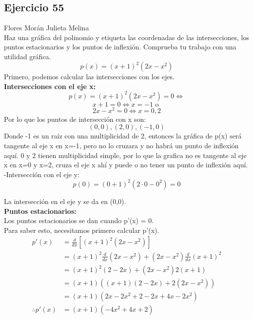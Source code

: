 \documentclass[12pt]{article}
\begin{document}
\subsection{Ejercicio 55} Flores Morán Julieta Melina \\

Haz una gráfica del polinomio y etiqueta las coordenadas de las intersecciones, los puntos estacionarios y los puntos de inflexión. Comprueba tu trabajo con una utilidad gráfica.
\[
p(x) = (x + 1)^2 (2x-x^2 )
\]
Primero, podemos calcular las intersecciones con los ejes. \\
\textbf {Intersecciones con el eje x:}
\[
p(x) = (x + 1)^2 (2x-x^2 ) = 0 \iff 
\]
\[
x+1 = 0 \iff  x = -1 \text{ o } 
 \]
 \[
 2x-x^{2}=0 \iff x = 0, 2
 \]
 Por lo que los puntos de intersección con x son:
 \[
(0,0), (2,0), (-1, 0)
 \]
 Donde -1 es un raíz con una multiplicidad de 2, entonces la gráfica de p(x) será tangente al eje x en x=-1, pero no lo cruzara y no habrá un punto de inflexión aquí. 0 y 2 tienen multiplicidad simple, por lo que la grafica no es tangente al eje x en x=0 y x=2, cruza el eje x ahí y puede o no tener un punto de inflexión aquí.\\
 -Intersección con el eje y:\\
 \[
 p(0) = (0 + 1)^2 (2\cdot0-0^2) = 0
 \]
 
 La intersección en el eje y se da en (0,0).\\
\textbf  {Puntos estacionarios:}\\
 Los puntos estacionarios se dan cuando p'(x) = 0.\\
 Para saber esto, necesitamos primero calcular p'(x).\\
 \begin{equation*}
  \begin{split}
    p'(x)
    &=  \frac{d} {dx} \left[ (x + 1)^2 (2x-x^2)\right]  \\
    &=   (x + 1)^2  \frac{d} {dx}(2x-x^2) + (2x-x^2) \frac{d} {dx} (x + 1)^2  \\
    &=   (x + 1)^2 (2-2x) + (2x-x^2)  2(x + 1)  \\
    &=   (x + 1) \left(  (x + 1) (2-2x)  +  2(2x-x^2)  \right) \\
    &=   (x + 1) \left(  2x-2x^{2}+2-2x  +  4x-2x^2  \right) \\
    \therefore
    p'(x)
    &=    (x + 1)\left(  -4x^{2} +4x+2\right) \\ \\
  \end{split}
 \end{equation*}
\end{document}
